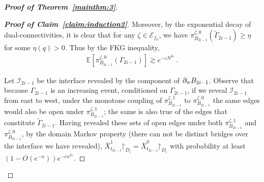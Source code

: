 \documentclass[reqno,11pt]{amsart}
\numberwithin{equation}{section}
\renewcommand{\restriction}{\mathord{\upharpoonright}}
\renewcommand{\epsilon}{\varepsilon}
\theoremstyle{definition}{
\newtheorem{example}[theorem]{Example}
\newtheorem{definition}[theorem]{Definition}
\newtheorem*{definition*}{Definition}
\newtheorem{problem}[theorem]{Problem}
\newtheorem{question}[theorem]{Question}
\newtheorem{remark}[theorem]{Remark}
}
\renewcommand{\epsilon}{\varepsilon}
\newcommand{\west}{{\textsc{w}}}
\begin{document}
\begin{proof}[\textbf{\emph{Proof of Theorem~\ref{mainthm:3}}}]
\begin{proof}[\textbf{\emph{Proof of Claim~\ref{claim:induction2}}}]
Moreover, by the exponential decay of dual-connectivities, it is clear that for any $\zeta \in \mathcal E_{f_n}$, we have $\pi_{B_{2i-1}}^{\zeta,0}(\tilde \Gamma_{2i-1})\geq \eta$ for some $\eta(q)>0$. Thus by the FKG inequality, 
\begin{align*}
 \mathbb E[\pi_{B_{2i-1}}^{\zeta,0}(\Gamma_{2i-1})] \gtrsim e^{-cN^{2\epsilon}}\,.
\end{align*}

Let $\mathcal I_{2i-1}$ be the interface revealed by the component of $\partial _\west B_{2i-1}$. Observe that because $\Gamma_{2i-1}$ is an increasing event, conditioned on $\Gamma_{2i-1}$, if we reveal $\mathcal I_{2i-1}$ from east to west, under the monotone coupling of $\pi^{\zeta,1}_{B_{2i-1}}$ to $\pi^{\zeta,0}_{B_{2i-1}}$ the same edges would also be open under $\pi^{\zeta,1}_{B_{2i-1}}$; the same is also true of the edges that constitute $\tilde \Gamma_{2i-1}$. Having revealed these sets of open edges under both $\pi^{\zeta,1}_{B_{2i-1}}$ and $\pi^{\zeta,0}_{B_{2i-1}}$, by the domain Markov property (there can not be distinct bridges over the interface we have revealed),  $\bar X_{t_{2i-1}}^1\restriction_{D_i} = \bar X_{t_{2i-1}}^0\restriction_{D_i}$ with probability at least $(1-O(e^{-n}))e^{-cn^{2\epsilon}}$.


\end{proof}
\end{proof}
\end{document}
